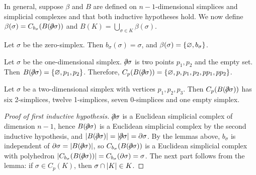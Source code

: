 In general, suppose \( \beta \) and \( B \) are defined on \( n-1 \)-dimensional simplices and simplicial complexes and that both inductive hypotheses hold.
We now define \( \beta(\sigma) = C_{b_\sigma}(B(\bound \sigma)) \) and \( B(K) = \bigcup_{\sigma \in K} \beta(\sigma) \).
\begin{example}
	Let \( \sigma \) be the zero-simplex.
	Then \( b_\sigma(\sigma) = \sigma \), and \( \beta(\sigma) = \qty{\varnothing, b_\sigma} \).
\end{example}
\begin{example}
	Let \( \sigma \) be the one-dimensional simplex.
	\( \bound\sigma \) is two points \( p_1, p_2 \) and the empty set.
	Then \( B(\bound\sigma) = \qty{\varnothing,p_1,p_2} \).
	Therefore, \( C_p(B(\bound\sigma)) = \qty{\varnothing, p, p_1, p_2, pp_1, pp_2} \).
\end{example}
\begin{example}
	Let \( \sigma \) be a two-dimensional simplex with vertices \( p_1, p_2, p_3 \).
	Then \( C_p(B(\bound\sigma)) \) has six 2-simplices, twelve 1-simplices, seven 0-simplices and one empty simplex.
\end{example}
\begin{proof}[Proof of first inductive hypothesis]
	\( \bound\sigma \) is a Euclidean simplicial complex of dimension \( n - 1 \), hence \( B(\bound\sigma) \) is a Euclidean simplicial complex by the second inductive hypothesis, and \( \abs{B(\bound\sigma)} = \abs{\bound\sigma} = \partial \sigma \).
	By the lemmas above, \( b_\sigma \) is independent of \( \partial\sigma = \abs{B(\bound\sigma)} \), so \( C_{b_\sigma}(B(\bound\sigma)) \) is a Euclidean simplicial complex with polyhedron \( \abs{C_{b_\sigma}(B(\bound\sigma))} = C_{b_\sigma}(\partial\sigma) = \sigma \).
	The next part follows from the lemma: if \( \sigma \in C_p(K) \), then \( \sigma \cap \abs{K} \in K \).
\end{proof}

